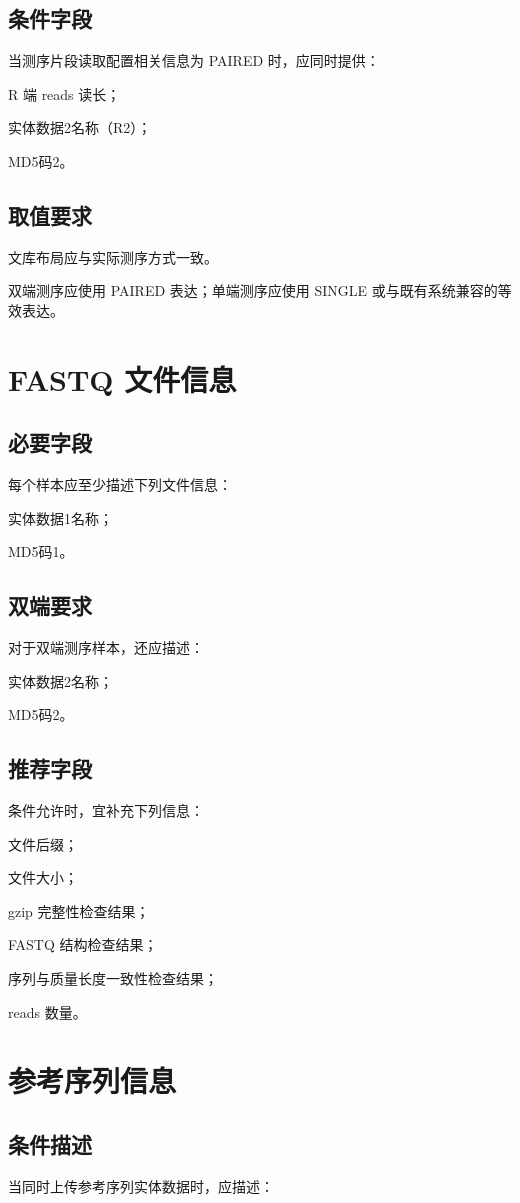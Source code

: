 \subsection{条件字段}
当测序片段读取配置相关信息为 PAIRED 时，应同时提供：

R 端 reads 读长；

实体数据2名称（R2）；

MD5码2。

\subsection{取值要求}
文库布局应与实际测序方式一致。

双端测序应使用 PAIRED 表达；单端测序应使用 SINGLE 或与既有系统兼容的等效表达。

\section{FASTQ 文件信息}
\subsection{必要字段}
每个样本应至少描述下列文件信息：

实体数据1名称；

MD5码1。

\subsection{双端要求}
对于双端测序样本，还应描述：

实体数据2名称；

MD5码2。

\subsection{推荐字段}
条件允许时，宜补充下列信息：

文件后缀；

文件大小；

gzip 完整性检查结果；

FASTQ 结构检查结果；

序列与质量长度一致性检查结果；

reads 数量。

\section{参考序列信息}
\subsection{条件描述}
当同时上传参考序列实体数据时，应描述：

